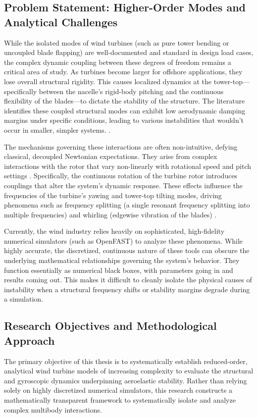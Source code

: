 \documentclass[final,onecolumn]{IEEEtran}
\begin{document}
\subsection{Problem Statement: Higher-Order Modes and Analytical Challenges}
While the isolated modes of wind turbines (such as pure tower bending or uncoupled blade flapping) are well-documented and standard in design load cases, the complex dynamic coupling between these degrees of freedom remains a critical area of study. As turbines become larger for offshore applications, they lose overall structural rigidity. This causes localized dynamics at the tower-top—specifically between the nacelle's rigid-body pitching and the continuous flexibility of the blades—to dictate the stability of the structure. The literature identifies these coupled structural modes can exhibit low aerodynamic damping margins under specific conditions, leading to various instabilities that wouldn't occur in smaller, simpler systems. \cite{hansen2007aeroelastic}.

The mechanisms governing these interactions are often non-intuitive, defying classical, decoupled Newtonian expectations. They arise from complex interactions with the rotor that vary non-linearly with rotational speed and pitch settings \cite{hansen2007aeroelastic}. Specifically, the continuous rotation of the turbine rotor introduces couplings that alter the system's dynamic response. These effects influence the frequencies of the turbine's yawing and tower-top tilting modes, driving phenomena such as frequency splitting (a single resonant frequency splitting into multiple frequencies) and whirling (edgewise vibration of the blades) \cite{hansen2003improved}.

Currently, the wind industry relies heavily on sophisticated, high-fidelity numerical simulators (such as OpenFAST) to analyze these phenomena. While highly accurate, the discretized, continuous nature of these tools can obscure the underlying mathematical relationships governing the system's behavior. They function essentially as numerical black boxes, with parameters going in and results coming out. This makes it difficult to cleanly isolate the physical causes of instability when a structural frequency shifts or stability margins degrade during a simulation.

\subsection{Research Objectives and Methodological Approach}
\label{sec:intro_objectives}
The primary objective of this thesis is to systematically establish reduced-order, analytical wind turbine models of increasing complexity to evaluate the structural and gyroscopic dynamics underpinning aeroelastic stability. Rather than relying solely on highly discretized numerical simulators, this research constructs a mathematically transparent framework to systematically isolate and analyze complex multibody interactions.
\end{document}

